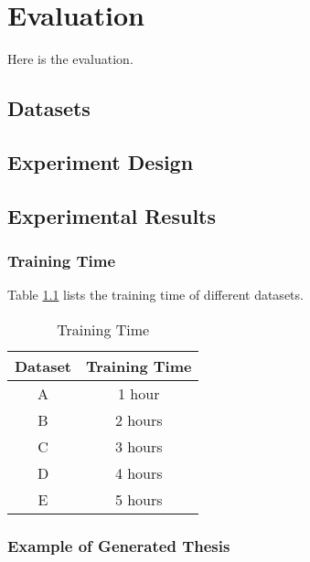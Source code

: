 \chapter{Evaluation} \label{chapter:evaluation}

Here is the evaluation.

\section{Datasets}

\section{Experiment Design}

\section{Experimental Results}

\subsection{Training Time}

Table \ref{table:training_time} lists the training time of different datasets.

\begin{table}[h!]
\centering
\caption{Training Time}
\begin{tabular}{ |c|c| } 
\hline
\textbf{Dataset} & \textbf{Training Time} \\
\hline
\hline
A & 1 hour \\
\hline
B & 2 hours \\
\hline
C & 3 hours \\
\hline
D & 4 hours \\
\hline
E & 5 hours \\
\hline
\end{tabular}
\label{table:training_time}
\end{table}

\subsection{Example of Generated Thesis}
